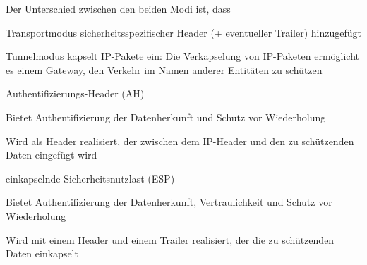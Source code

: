 \documentclass[a4paper]{article}
\begin{document}
\begin{multicols}{3}
      Der Unterschied zwischen den beiden Modi ist, dass
      \begin{description*}
            \item[Transportmodus] sicherheitsspezifischer Header (+ eventueller Trailer) hinzugefügt
            \item[Tunnelmodus] kapselt IP-Pakete ein: Die Verkapselung von IP-Paketen ermöglicht es einem Gateway, den Verkehr im Namen anderer Entitäten zu schützen
            \item [Authentifizierungs-Header] (AH)
            \begin{itemize*}
                  \item Bietet Authentifizierung der Datenherkunft und Schutz vor Wiederholung
                  \item Wird als Header realisiert, der zwischen dem IP-Header und den zu schützenden Daten eingefügt wird
            \end{itemize*}
            \item[einkapselnde Sicherheitsnutzlast] (ESP)
            \begin{itemize*}
                  \item Bietet Authentifizierung der Datenherkunft, Vertraulichkeit und Schutz vor Wiederholung
                  \item Wird mit einem Header und einem Trailer realisiert, der die zu schützenden Daten einkapselt
            \end{itemize*}
      \end{description*}


\end{multicols}
\end{document}

